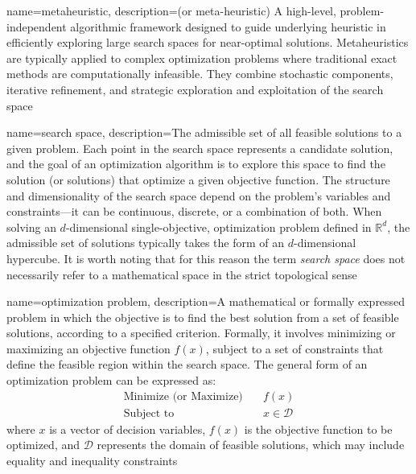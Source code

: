 {
    name=metaheuristic,
    description={(or meta-heuristic) A high-level, problem-independent algorithmic framework designed to guide underlying heuristic in efficiently exploring large search spaces for near-optimal solutions. Metaheuristics are typically applied to complex optimization problems where traditional exact methods are computationally infeasible. They combine stochastic components, iterative refinement, and strategic exploration and exploitation of the search space}
}

{
    name=search space,
    description={The admissible set of all feasible solutions to a given problem. Each point in the search space represents a candidate solution, and the goal of an optimization algorithm is to explore this space to find the solution (or solutions) that optimize a given objective function. The structure and dimensionality of the search space depend on the problem's variables and constraints---it can be continuous, discrete, or a combination of both. When solving an $d$-dimensional single-objective, optimization problem defined in $\mathbb{R}^{d}$, the admissible set of solutions typically takes the form of an $d$-dimensional hypercube. It is worth noting that for this reason the term \textit{search space} does not necessarily refer to a mathematical space in the strict topological sense}
}

{
    name=optimization problem,
    description={A mathematical or formally expressed problem in which the objective is to find the best solution from a set of feasible solutions, according to a specified criterion. Formally, it involves minimizing or maximizing an objective function $f(x)$, subject to a set of constraints that define the feasible region within the search space. The general form of an optimization problem can be expressed as:%
$$
\begin{aligned}
\text{Minimize (or Maximize)} \quad & f(x) \\
\text{Subject to} \quad & x \in \mathcal{D}
\end{aligned}
$$
where $x$ is a vector of decision variables, $f(x)$ is the objective function to be optimized, and $\mathcal{D}$ represents the domain of feasible solutions, which may include equality and inequality constraints}
}
